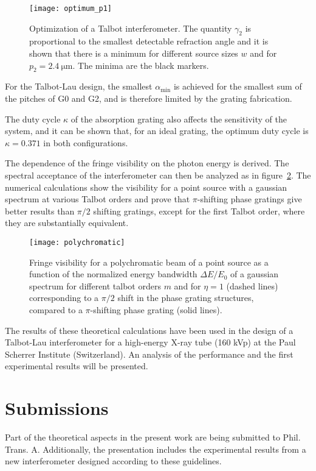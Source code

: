 \documentclass[a4paper]{article}
\begin{document}
\begin{figure}[h]
    \centering
    \texttt{[image: optimum\_p1]}
    \caption{Optimization of a Talbot interferometer. The quantity
    $\gamma_2$ is proportional to the smallest detectable refraction angle
and it is shown that there is a minimum for different source sizes
$w$ and for $p_2 = \SI{2.4}{\micro\metre}$. The minima are the black
markers.}
    \label{optimum_p1}
\end{figure}

For the Talbot-Lau design, the smallest $\alpha_\text{min}$ is achieved for
the smallest sum of the pitches of G0 and G2, and is therefore limited by
the grating fabrication.

The duty cycle $\kappa$ of the absorption grating also affects the sensitivity of the
system, and it can be shown that, for an ideal grating, the optimum duty
cycle is $\kappa = 0.371$ in both configurations.

The dependence of the fringe
visibility on the photon energy is derived. The spectral acceptance of the
interferometer can then be analyzed as in figure~\ref{fringe_visibility}.
The numerical calculations show the visibility for a point source with a gaussian spectrum
at various Talbot orders and prove
that $\pi$-shifting phase gratings give better results than $\pi/2$ shifting
gratings, except for the first Talbot order, where they are substantially
equivalent. 

\begin{figure}[h]
    \centering
    \texttt{[image: polychromatic]}
    \caption{Fringe visibility for a polychromatic beam of a point source as
    a function of the normalized energy bandwidth $\Delta E / E_0$ of a
gaussian spectrum for different talbot orders $m$ and for $\eta = 1$
(dashed lines) corresponding to a $\pi / 2$ shift in the phase grating
structures, compared to a $\pi$-shifting phase grating (solid lines).}
    \label{fringe_visibility}
\end{figure}

The results of these theoretical calculations have been used
in the design of a Talbot-Lau interferometer for a high-energy X-ray tube
(160 kVp) at the Paul Scherrer Institute (Switzerland).
An analysis of the performance and the first experimental results will be
presented.

\section{Submissions}
Part of the theoretical aspects in the present work are being submitted to
Phil. Trans. A.
Additionally, the presentation includes the experimental results from a new
interferometer designed according to these guidelines.
\end{document}
